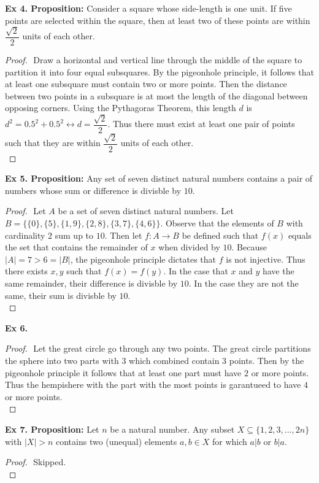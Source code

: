 \documentclass{article}
\begin{document}
\textbf{Ex 4. Proposition:} Consider a square whose side-length is one unit. If five points are selected within the square, then at least two of these points are within $\dfrac{\sqrt{2}}{2}$ units of each other.
\begin{proof}
$ $\newline
Draw a horizontal and vertical line through the middle of the square to partition it into four equal subsquares. By the pigeonhole principle, it follows that at least one subsquare must contain two or more points. Then the distance between two points in a subsquare is at most the length of the diagonal between opposing corners. Using the Pythagoras Theorem, this length $d$ is $d^2=0.5^2+0.5^2 \leftrightarrow d=\dfrac{\sqrt{2}}{2}$. Thus there must exist at least one pair of points such that they are within $\dfrac{\sqrt{2}}{2}$ units of each other.\\
\end{proof}

\textbf{Ex 5. Proposition:} Any set of seven distinct natural numbers contains a pair of numbers whose sum or difference is divisble by $10$.
\begin{proof}
$ $\newline
Let $A$ be a set of seven distinct natural numbers. Let $B=\{\{0\}, \{5\}, \{1, 9\}, \{2, 8\}, \{3, 7\}, \{4, 6\} \}$. Observe that the elements of $B$ with cardinality $2$ sum up to $10$. Then let $f: A \rightarrow B$ be defined such that $f(x)$ equals the set that contains the remainder of $x$ when divided by $10$. Because $|A|= 7 > 6 = |B|$, the pigeonhole principle dictates that $f$ is not injective. Thus there exists $x, y$ such that $f(x)=f(y)$. In the case that $x$ and $y$ have the same remainder, their difference is divisble by $10$. In the case they are not the same, their sum is divisble by $10$.\\
\end{proof}

\textbf{Ex 6.}
\begin{proof}
$ $\newline
Let the great circle go through any two points. The great circle partitions the sphere into two parts with $3$ which combined contain $3$ points. Then by the pigeonhole principle it follows that at least one part must have $2$ or more points. Thus the hempishere with the part with the most points is garantueed to have $4$ or more points.\\
\end{proof}

\textbf{Ex 7. Proposition:} Let $n$ be a natural number. Any subset $X \subseteq \{1,2,3,...,2n\}$ with $|X| > n$ contains two (unequal) elements $a, b \in X$ for which $a|b$ or $b|a$.
\begin{proof}
$ $\newline
Skipped.
\\
\end{proof}
\end{document}
